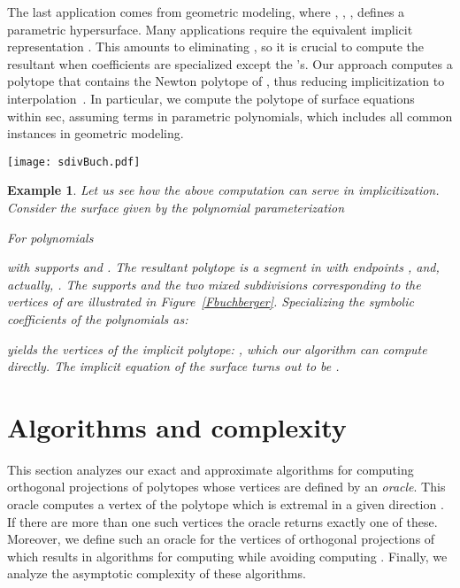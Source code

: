 \documentclass{article}
\newtheorem{example}{Example}
\begin{document}
The last application comes from geometric modeling, where
, , ,
defines a parametric hypersurface. 
Many applications 
require the equivalent implicit representation
.
This amounts to eliminating , so 
it is crucial to compute the resultant 
when coefficients are specialized except the 's.
Our approach computes a polytope
that contains the Newton polytope of , thus reducing implicitization
to interpolation~.
In particular, we compute the polytope of surface equations within sec,
assuming  terms in parametric polynomials,
which includes all common instances in geometric modeling.

\begin{figure*}[t]\centering
{}
\qquad \texttt{[image: sdivBuch.pdf]} 
\caption[]{The supports  of Example~\ref{ExamBuchberger}, their
Newton polytopes (segments) and the two mixed subdivisions of their Minkowski
sum.
\label{Fbuchberger}} 
\end{figure*}

\begin{example} \label{ExamBuchberger} 
Let us see how the above computation can serve in implicitization.
Consider the surface given by the polynomial parameterization 

For polynomials

with supports
 and .
The resultant polytope is a segment in  with endpoints
,   and, actually,
.
The supports and the two mixed subdivisions corresponding to the vertices of
 are illustrated in Figure~\ref{Fbuchberger}.
Specializing the symbolic coefficients of the polynomials as: 

yields the vertices of the implicit polytope: ,
which our algorithm can compute directly.
The implicit equation of the surface turns out to be .
\end{example}


\section{Algorithms and complexity}\label{Sproject}
\newcommand{\Li}{{\cal L}}
 \newcommand{\Sub}{{\cal S}}
 \newcommand{\T}{{T}}
 \newcommand{\J}{{\cal J}}
 \newcommand{\illH}{{\cal H}_{illegal}}
 \newcommand{\W}{{\cal W}}
 \newcommand{\Q}{Q^{H}}
 \newcommand{\Qo}{Q_o^{H}}
 \newcommand{\V}{Q}

This section analyzes our exact and approximate algorithms for computing
orthogonal projections of polytopes whose vertices are defined by an
\emph{oracle}.
This oracle computes a 
vertex of the polytope which is extremal in a given
direction . If there are more than one such vertices 
the oracle returns exactly one of these. Moreover, we define such an oracle for the
vertices of orthogonal projections  of  which results in algorithms for
computing  while avoiding computing . 
Finally, we analyze the
asymptotic complexity of these algorithms.
\end{document}
